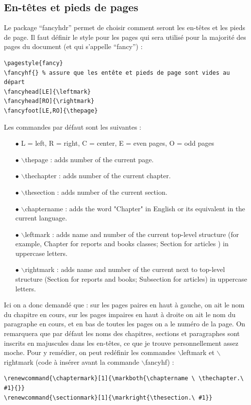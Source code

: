 \subsection{En-têtes et pieds de pages}
\label{chap1:sec:exemple_fancyhdr}

Le package ``fancyhdr'' permet de choisir comment seront les en-têtes et les pieds de page. Il faut définir le style pour les pages qui sera utilisé pour la majorité des pages du document (et qui s'appelle ``fancy'') :
{\small \begin{verbatim}
\pagestyle{fancy}
\fancyhf{} % assure que les entête et pieds de page sont vides au départ
\fancyhead[LE]{\leftmark}
\fancyhead[RO]{\rightmark}
\fancyfoot[LE,RO]{\thepage}
\end{verbatim}}
\noindent Les commandes par défaut sont les suivantes :
\begin{itemize}
\item[$\bullet$] L = left, R = right, C = center, E = even pages, O = odd pages
\item[$\bullet$] $\backslash$thepage : adds number of the current page.
\item[$\bullet$] $\backslash$thechapter : adds number of the current chapter.
\item[$\bullet$] $\backslash$thesection : adds number of the current section.
\item[$\bullet$] $\backslash$chaptername : adds the word "Chapter" in English or its equivalent in the current language.
\item[$\bullet$] $\backslash$leftmark : adds name and number of the current top-level structure (for example, Chapter for reports and books classes; Section for articles ) in uppercase letters.
\item[$\bullet$] $\backslash$rightmark : adds name and number of the current next to top-level structure (Section for reports and books; Subsection for articles) in uppercase letters.
\end{itemize}
Ici on a donc demandé que : sur les pages paires en haut à gauche, on ait le nom du chapitre en cours, sur les pages impaires en haut à droite on ait le nom du paragraphe en cours, et en bas de toutes les pages on a le numéro de la page. On remarquera que par défaut les noms des chapitres, sections et paragraphes sont inscrits en majuscules dans les en-têtes, ce que je trouve personnellement assez moche. Pour y remédier, on peut redéfinir les commandes $\backslash$leftmark et $\backslash$rightmark (code à insérer avant la commande $\backslash$fancyhf{}) :
{\small\begin{verbatim}
\renewcommand{\chaptermark}[1]{\markboth{\chaptername \ \thechapter.\ #1}{}}
\renewcommand{\sectionmark}[1]{\markright{\thesection.\ #1}}
\end{verbatim}}

